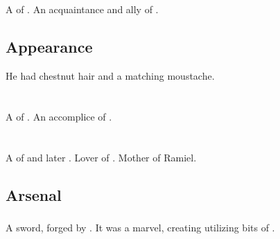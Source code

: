 \section{\Dezruth}
\index{\Dezruth}
A \thelyad{} \resphan{} of \Mystraacht. 
An acquaintance and ally of . 









\subsection{Appearance}
He had chestnut hair and a matching moustache. 















\section{\Gilchad}
\index{\Gilchad}
A \thelyad{} \resphan{} of \Mystraacht. 
An accomplice of \Cishiel. 

















\section{\Lyorith}
\index{\Lyorith}
A \resvil{} of \Merkyrah{} and later \Mystraacht. 
Lover of \Nathrach. 
Mother of Ramiel. 









\subsection{Arsenal}
\subsubsection{\Ascaril}
\index{\Ascaril}
A  sword, forged by \Lyorith. 
It was a marvel, creating utilizing bits of . 


